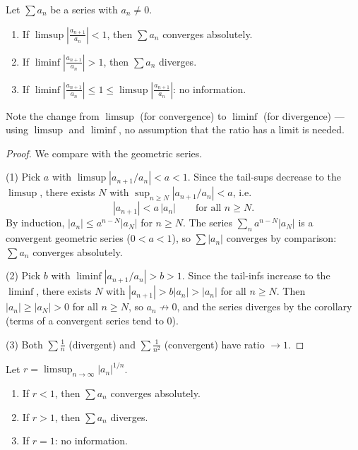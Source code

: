 \documentclass[11pt]{report}
\begin{document}
\begin{thmbox}
Let $\sum a_n$ be a series with $a_n \neq 0$.
\begin{enumerate}[label=(\arabic*)]
    \item If $\limsup \left| \tfrac{a_{n+1}}{a_n} \right| < 1$, then $\sum a_n$ converges absolutely.
    \item If $\liminf \left| \tfrac{a_{n+1}}{a_n} \right| > 1$, then $\sum a_n$ diverges.
    \item If $\liminf \left| \tfrac{a_{n+1}}{a_n} \right| \leq 1 \leq \limsup \left| \tfrac{a_{n+1}}{a_n} \right|$: no information.
\end{enumerate}
Note the change from $\limsup$ (for convergence) to $\liminf$ (for divergence) --- using $\limsup$ and $\liminf$, no assumption that the ratio has a limit is needed.
\end{thmbox}

\begin{proof}
We compare with the geometric series.

(1) Pick $a$ with $\limsup |a_{n+1}/a_n| < a < 1$. Since the tail-sups decrease to the $\limsup$, there exists $N$ with $\sup_{n \geq N} |a_{n+1}/a_n| < a$, i.e.
\[
|a_{n+1}| < a\, |a_n| \qquad \text{for all } n \geq N.
\]
By induction, $|a_n| \leq a^{n-N} |a_N|$ for $n \geq N$. The series $\sum_n a^{n-N}|a_N|$ is a convergent geometric series ($0 < a < 1$), so $\sum |a_n|$ converges by comparison: $\sum a_n$ converges absolutely.

(2) Pick $b$ with $\liminf |a_{n+1}/a_n| > b > 1$. Since the tail-infs increase to the $\liminf$, there exists $N$ with $|a_{n+1}| > b |a_n| > |a_n|$ for all $n \geq N$. Then $|a_n| \geq |a_N| > 0$ for all $n \geq N$, so $a_n \not\to 0$, and the series diverges by the corollary (terms of a convergent series tend to $0$).

(3) Both $\sum \tfrac1n$ (divergent) and $\sum \tfrac1{n^2}$ (convergent) have ratio $\to 1$.
\end{proof}

\begin{thmbox}
Let $r = \limsup_{n\to\infty} |a_n|^{1/n}$.
\begin{enumerate}[label=(\arabic*)]
    \item If $r < 1$, then $\sum a_n$ converges absolutely.
    \item If $r > 1$, then $\sum a_n$ diverges.
    \item If $r = 1$: no information.
\end{enumerate}
\end{thmbox}
\end{document}
